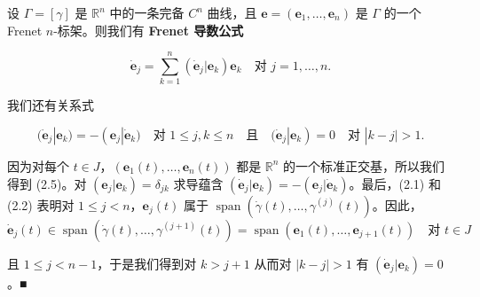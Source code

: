 \begin{corollary}

设 $ \Gamma = [\gamma] $ 是 $ \mathbb{R}^n $ 中的一条完备 $ C^n $ 曲线，且 $ \mathbf{e} = (\mathbf{e}_1, \ldots, \mathbf{e}_n) $ 是 $ \Gamma $ 的一个 Frenet $ n $-标架。则我们有 \textbf{Frenet 导数公式}

\begin{equation}
\dot{\mathbf{e}}_j = \sum_{k=1}^{n}(\dot{\mathbf{e}}_j|\mathbf{e}_k)\mathbf{e}_k \quad \text{对 } j = 1, \ldots, n .\tag{2.5}
\end{equation}

我们还有关系式

\[
(\dot{\mathbf{e}}_j|\mathbf{e}_k) = -(\mathbf{e}_j|\dot{\mathbf{e}}_k) \quad \text{对 } 1 \le j, k \le n \quad \text{且} \quad (\dot{\mathbf{e}}_j|\mathbf{e}_k) = 0 \quad \text{对 } |k - j| > 1 .
\]

\proofhead
因为对每个 $ t \in J $，$ (\mathbf{e}_1(t), \ldots, \mathbf{e}_n(t)) $ 都是 $ \mathbb{R}^n $ 的一个标准正交基，所以我们得到 (2.5)。对 $ (\mathbf{e}_j|\mathbf{e}_k) = \delta_{jk} $ 求导蕴含 $ (\dot{\mathbf{e}}_j|\mathbf{e}_k) = -(\mathbf{e}_j|\dot{\mathbf{e}}_k) $。最后，(2.1) 和 (2.2) 表明对 $ 1 \le j < n $，$ \mathbf{e}_j(t) $ 属于 $ \operatorname{span}(\dot\gamma(t), \ldots, \gamma^{(j)}(t)) $。因此，
\[
\dot{\mathbf{e}}_j(t) \in \operatorname{span}(\dot\gamma(t), \ldots, \gamma^{(j+1)}(t)) = \operatorname{span}(\mathbf{e}_1(t), \ldots, \mathbf{e}_{j+1}(t)) \quad \text{对 } t \in J
\]

且 $ 1 \le j < n - 1 $，于是我们得到对 $ k > j + 1 $ 从而对 $ |k - j| > 1 $ 有 $ (\dot{\mathbf{e}}_j|\mathbf{e}_k) = 0 $。\nobreak\hspace{0.35em}■

\end{corollary}

